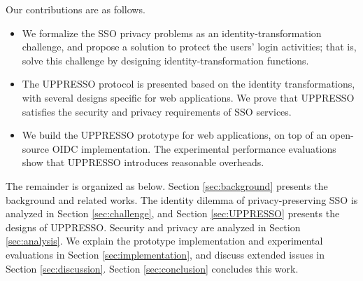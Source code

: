 %
%
Our contributions are as follows.
\vspace{-\topsep}\begin{itemize}
\setlength{\topsep}{0pt}
\setlength{\partopsep}{0pt}
\setlength{\itemsep}{0pt}
\setlength{\parsep}{0pt}
\setlength{\parskip}{0pt}
\item We formalize the SSO privacy problems as an identity-transformation challenge,
    and
propose a  solution to protect the users' login activities;
    that is, solve this challenge by designing identity-transformation functions.
\item
The UPPRESSO protocol is presented based on the identity transformations,
    with several designs specific for web applications.
We prove that UPPRESSO satisfies the security and privacy requirements of SSO services.


\item
We build the UPPRESSO prototype for web applications,
    on top of an open-source OIDC implementation.
The experimental performance evaluations show that UPPRESSO introduces reasonable overheads.
\end{itemize}


The remainder is organized as below.
Section \ref{sec:background} presents
    the background and related works.
The identity dilemma of privacy-preserving SSO is analyzed  in Section \ref{sec:challenge},
    and Section \ref{sec:UPPRESSO} presents the designs of UPPRESSO.
Security and privacy are analyzed in Section \ref{sec:analysis}.
We explain the prototype implementation and experimental evaluations in Section \ref{sec:implementation},
 and discuss extended issues in Section \ref{sec:discussion}.
Section \ref{sec:conclusion} concludes this work.
